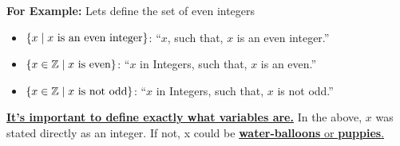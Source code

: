 \noindent
\textbf{For Example:} Lets define the set of even integers\\
\vspace{-1em}
\begin{itemize}
    \item $\{x \mid x \textnormal{ is an even integer}\}$: ``$x$, such that, $x$ is an even integer.''
    \item $\{x \in \mathbb{Z} \mid x \textnormal{ is even}\}$: ``$x$ in Integers, such that, $x$ is an even.''
    \item $\{x \in \mathbb{Z} \mid x \textnormal{ is not odd}\}$: ``$x$ in Integers, such that, $x$ is not odd.''
\end{itemize}

\noindent
\underline{\textbf{It's important to define exactly what variables are.}}
In the above, $x$ was stated directly as an integer. If not, x could be \underline{\textbf{water-balloons} or \textbf{puppies}.}
